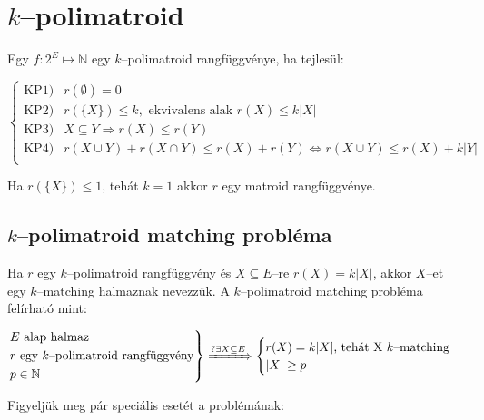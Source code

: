 \newpage
\section{\texorpdfstring{$k$--polimatroid}
		 {k--polimatroid}}

Egy  $f:2^E \mapsto \mathbb{N}$ egy $k$--polimatroid rangfüggvénye, ha tejlesül:

\[
\begin{cases}
\mbox{KP1})& r(\emptyset)=0\\
\mbox{KP2})& r(\{X\}) \leq k, \mbox{ ekvivalens alak } r(X) \leq k |X|  \\
\mbox{KP3})& X \subseteq Y \Rightarrow r(X) \leq r(Y)\\
\mbox{KP4})& r(X \cup Y) + r (X \cap Y) \leq r(X) + r(Y) \Leftrightarrow r(X \cup Y) \leq r(X) + k|Y| \\
\end{cases}
\]

Ha $r(\{X\}) \leq 1$, tehát $k=1$ akkor $r$ egy matroid rangfüggvénye. 

\subsection{\texorpdfstring{$k$--polimatroid matching probléma}
		 {k--polimatroid matching probléma}}


Ha $r$ egy $k$--polimatroid rangfüggvény és $X\subseteq E$--re $r(X)=k|X|$,
akkor $X$--et egy $k$--matching halmaznak nevezzük. A $k$--polimatroid matching
probléma felírható mint:

\[
\begin{rcases}
E \mbox{ alap halmaz} \\
r \mbox{ egy } k \mbox{--polimatroid rangfüggvény} \\
p \in \mathbb{N} \\
\end{rcases}  \xRightarrow {?\exists X \subseteq E}
\begin{cases}
r(X)=k|X| \mbox{, tehát X } k \mbox{--matching} \\
|X| \geq p 
\end{cases}
\]

Figyeljük meg pár speciális esetét a problémának:


